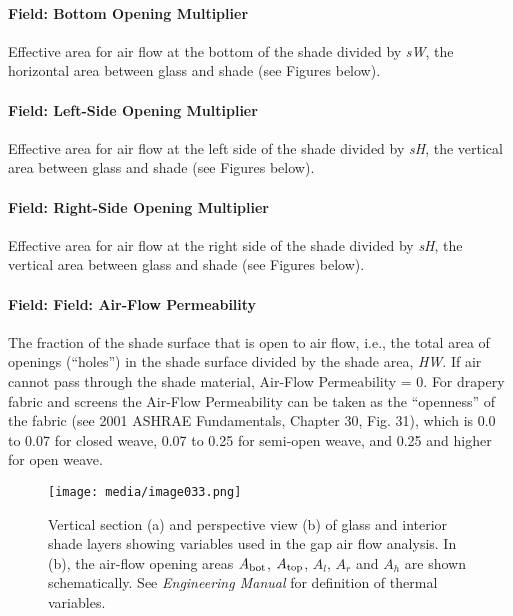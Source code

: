 \paragraph{Field: Bottom Opening Multiplier}\label{field-bottom-opening-multiplier}

Effective area for air flow at the bottom of the shade divided by \emph{sW}, the horizontal area between glass and shade (see Figures below).

\paragraph{Field: Left-Side Opening Multiplier}\label{field-left-side-opening-multiplier}

Effective area for air flow at the left side of the shade divided by \emph{sH}, the vertical area between glass and shade (see Figures below).

\paragraph{Field: Right-Side Opening Multiplier}\label{field-right-side-opening-multiplier}

Effective area for air flow at the right side of the shade divided by \emph{sH}, the vertical area between glass and shade (see Figures below).

\paragraph{Field: Field: Air-Flow Permeability}\label{field-field-air-flow-permeability}

The fraction of the shade surface that is open to air flow, i.e., the total area of openings (``holes'') in the shade surface divided by the shade area, \emph{HW}. If air cannot pass through the shade material, Air-Flow Permeability = 0. For drapery fabric and screens the Air-Flow Permeability can be taken as the ``openness'' of the fabric (see 2001 ASHRAE Fundamentals, Chapter 30, Fig. 31), which is 0.0 to 0.07 for closed weave, 0.07 to 0.25 for semi-open weave, and 0.25 and higher for open weave.

\begin{figure}[hbtp] %
\centering
\texttt{[image: media/image033.png]}
\caption{Vertical section (a) and perspective view (b) of glass  and interior shade layers  showing variables used in the gap air flow analysis. In (b), the air-flow opening areas \(A_{\rm{bot}}\), \(A_{\rm{top}}\), \(A_{l}\), \(A_{r}\) and \(A_{h}\) are shown schematically. See \emph{Engineering Manual} for definition of thermal variables. \protect \label{fig:vertical-section-a-and-perspective-view-b-of}}
\end{figure}

